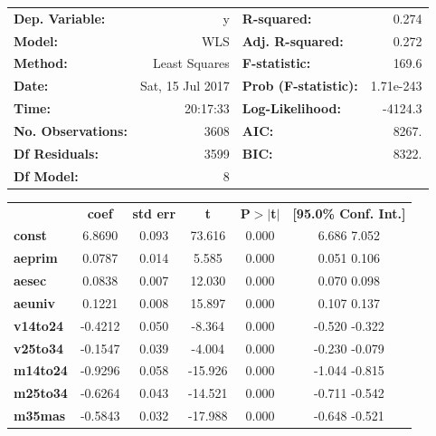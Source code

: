     \begin{table}
    	\begin{tabular}{lrlr}
    		\textbf{Dep. Variable:}    &        y         & \textbf{  R-squared:         } &     0.274   \\
    		\textbf{Model:}            &       WLS        & \textbf{  Adj. R-squared:    } &     0.272   \\
    		\textbf{Method:}           &  Least Squares   & \textbf{  F-statistic:       } &     169.6   \\
    		\textbf{Date:}             & Sat, 15 Jul 2017 & \textbf{  Prob (F-statistic):} & 1.71e-243   \\
    		\textbf{Time:}             &     20:17:33     & \textbf{  Log-Likelihood:    } &   -4124.3   \\
    		\textbf{No. Observations:} &        3608      & \textbf{  AIC:               } &     8267.   \\
    		\textbf{Df Residuals:}     &        3599      & \textbf{  BIC:               } &     8322.   \\
    		\textbf{Df Model:}         &           8      & \textbf{                     } &             \\
    		
    	\end{tabular}
    	\begin{tabular}{lccccc}
    		& \textbf{coef} & \textbf{std err} & \textbf{t} & \textbf{P$>$$|$t$|$} & \textbf{[95.0\% Conf. Int.]}  \\
    		
    		\textbf{const} &       6.8690  &        0.093     &    73.616  &         0.000        &         6.686     7.052       \\
    		\textbf{aeprim}    &       0.0787  &        0.014     &     5.585  &         0.000        &         0.051     0.106       \\
    		\textbf{aesec}    &       0.0838  &        0.007     &    12.030  &         0.000        &         0.070     0.098       \\
    		\textbf{aeuniv}    &       0.1221  &        0.008     &    15.897  &         0.000        &         0.107     0.137       \\
    		\textbf{v14to24}    &      -0.4212  &        0.050     &    -8.364  &         0.000        &        -0.520    -0.322       \\
    		\textbf{v25to34}    &      -0.1547  &        0.039     &    -4.004  &         0.000        &        -0.230    -0.079       \\
    		\textbf{m14to24}    &      -0.9296  &        0.058     &   -15.926  &         0.000        &        -1.044    -0.815       \\
    		\textbf{m25to34}    &      -0.6264  &        0.043     &   -14.521  &         0.000        &        -0.711    -0.542       \\
    		\textbf{m35mas}    &      -0.5843  &        0.032     &   -17.988  &         0.000        &        -0.648    -0.521       \\


\end{tabular}
\end{table}
